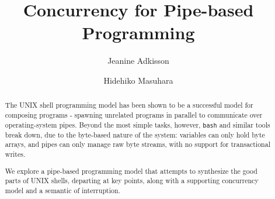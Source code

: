 \documentclass[sigplan,10pt,nosumlimits]{acmart}
\title{Concurrency for Pipe-based Programming}
\author{Jeanine Adkisson}
\affiliation{\institution{Tokyo Institute of Technology}}
\author{Hidehiko Masuhara}
\affiliation{\institution{Tokyo Institute of Technology}}
\begin{document}

\begin{abstract}
The UNIX shell programming model has been shown to be a successful model for composing programs - spawning unrelated programs in parallel to communicate over operating-system pipes. Beyond the most simple tasks, however, \texttt{bash} and similar tools break down, due to the byte-based nature of the system: variables can only hold byte arrays, and pipes can only manage raw byte streams, with no support for transactional writes.

We explore a pipe-based programming model that attempts to synthesize the good parts of UNIX shells, departing at key points, along with a supporting concurrency model and a semantic of interruption.

% 
% 
% 
\end{abstract}
\maketitle
\end{document}
